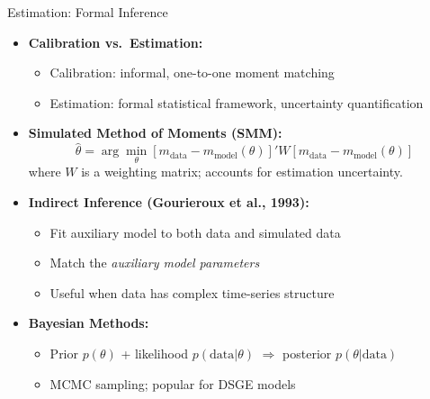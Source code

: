 \documentclass[10pt,english,aspectratio=169]{beamer}
\begin{document}
\begin{frame}{Estimation: Formal Inference}
\begin{itemize}
\item \textbf{Calibration vs.\ Estimation:}
\begin{itemize}
    \item Calibration: informal, one-to-one moment matching
    \item Estimation: formal statistical framework, uncertainty quantification
\end{itemize}

\medskip
\item \textbf{Simulated Method of Moments (SMM):}
\[
\hat{\theta} = \arg\min_\theta \left[ m_{\text{data}} - m_{\text{model}}(\theta) \right]' W \left[ m_{\text{data}} - m_{\text{model}}(\theta) \right]
\]
where $W$ is a weighting matrix; accounts for estimation uncertainty.

\medskip
\item \textbf{Indirect Inference (Gourieroux et al., 1993):}
\begin{itemize}
    \item Fit auxiliary model to both data and simulated data
    \item Match the \emph{auxiliary model parameters}
    \item Useful when data has complex time-series structure
\end{itemize}

\medskip
\item \textbf{Bayesian Methods:}
\begin{itemize}
    \item Prior $p(\theta)$ + likelihood $p(\text{data}|\theta)$ $\Rightarrow$ posterior $p(\theta|\text{data})$
    \item MCMC sampling; popular for DSGE models
\end{itemize}
\end{itemize}
\end{frame}
\end{document}
